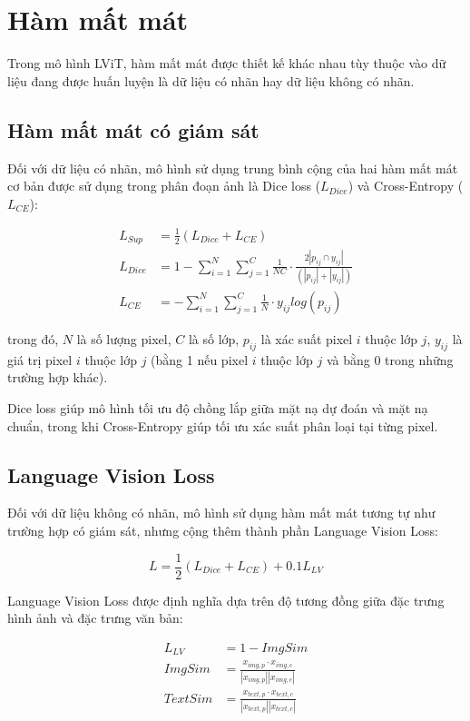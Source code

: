 \section{Hàm mất mát}

Trong mô hình LViT, hàm mất mát được thiết kế khác nhau tùy thuộc vào dữ liệu đang được huấn luyện là dữ liệu có nhãn hay dữ liệu không có nhãn.

\subsection{Hàm mất mát có giám sát}

Đối với dữ liệu có nhãn, mô hình sử dụng trung bình cộng của hai hàm mất mát cơ bản được sử dụng trong phân đoạn ảnh là Dice loss ($L_{Dice}$) và Cross-Entropy ($L_{CE}$):

\begin{align*}
    L_{Sup} &= \frac{1}{2}(L_{Dice} + L_{CE}) \\
    L_{Dice} &= 1 - \sum_{i=1}^{N} \sum_{j=1}^{C} \frac{1}{NC} \cdot \frac{2 | p_{ij} \cap y_{ij}|}{(|p_{ij}| + |y_{ij}|)} \\
    L_{CE} &= - \sum_{i=1}^{N} \sum_{j=1}^{C} \frac{1}{N} \cdot y_{ij} log(p_{ij})
\end{align*}

trong đó, $N$ là số lượng pixel, $C$ là số lớp, $p_{ij}$ là xác suất pixel $i$ thuộc lớp $j$, $y_{ij}$ là giá trị pixel $i$ thuộc lớp $j$ (bằng 1 nếu pixel $i$ thuộc lớp $j$ và bằng 0 trong những trường hợp khác).

Dice loss giúp mô hình tối ưu độ chồng lắp giữa mặt nạ dự đoán và mặt nạ chuẩn, trong khi Cross-Entropy giúp tối ưu xác suất phân loại tại từng pixel.

\subsection{Language Vision Loss}

Đối với dữ liệu không có nhãn, mô hình sử dụng hàm mất mát tương tự như trường hợp có giám sát, nhưng cộng thêm thành phần Language Vision Loss:

\[
    L = \frac{1}{2}(L_{Dice} + L_{CE}) + 0.1 L_{LV}
\]

Language Vision Loss được định nghĩa dựa trên độ tương đồng giữa đặc trưng hình ảnh và đặc trưng văn bản:

\begin{align*}
    L_{LV} &= 1 - ImgSim \\
    ImgSim &= \frac{x_{img, p} \cdot x_{img, c}}{|x_{img, p}||x_{img, c}|} \\
    TextSim &= \frac{x_{text, p} \cdot x_{text, c}}{|x_{text, p}||x_{text, c}|}
\end{align*}

